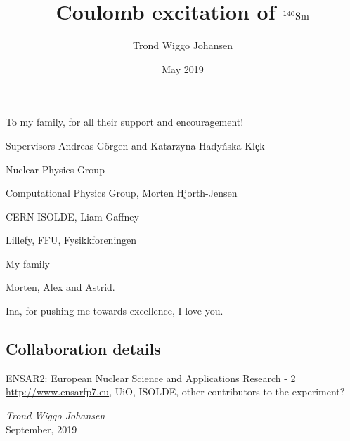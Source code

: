 \documentclass[twoside,english]{uiofysmaster/uiofysmaster}
\author{Trond Wiggo Johansen}
\title{Coulomb excitation of $\textnormal{$^{140}$Sm}$}
\date{May 2019}
\begin{document}
\setlength{\belowdisplayskip}{12pt} \setlength{\belowdisplayshortskip}{12pt}
\setlength{\abovedisplayskip}{12pt} \setlength{\abovedisplayshortskip}{12pt}

\maketitle


\begin{abstract}


\end{abstract}


\begin{dedication}
To my family, for all their support and encouragement!

\end{dedication}

\begin{acknowledgements}
Supervisors Andreas Görgen and Katarzyna Hady\'nska-Kl\c ek

Nuclear Physics Group

Computational Physics Group, Morten Hjorth-Jensen

CERN-ISOLDE, Liam Gaffney

Lillefy, FFU, Fysikkforeningen

My family

Morten, Alex and Astrid.

Ina, for pushing me towards excellence, I love you.

\subsection*{Collaboration details}



ENSAR2: European Nuclear Science and Applications Research - 2 \url{http://www.ensarfp7.eu}, UiO, ISOLDE, other contributors to the experiment?

  \vspace{1.5cm}
  
  \noindent\textit{Trond Wiggo Johansen}\\
  
  \noindent September, 2019
  
\end{acknowledgements}


\tableofcontents
\end{document}
